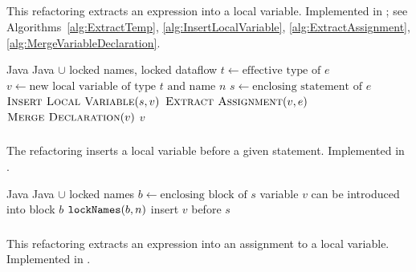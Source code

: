 \subsection{}
This refactoring extracts an expression into a local variable. Implemented in ; see Algorithms~\ref{alg:ExtractTemp}, \ref{alg:InsertLocalVariable}, \ref{alg:ExtractAssignment}, \ref{alg:MergeVariableDeclaration}.

\begin{algorithm}[p]
\caption{$\refactoring{Extract Temp}(e : \type{Expr}, n : \type{Name}) : LocalVar$}
\label{alg:ExtractTemp}
\begin{algorithmic}[1]
\REQUIRE Java
\ENSURE Java $\cup$ locked names, locked dataflow
\medskip
\STATE $t \leftarrow \text{effective type of $e$}$
\STATE $v \leftarrow \text{new local variable of type $t$ and name $n$}$
\STATE $s \leftarrow \text{enclosing statement of $e$}$
\STATE $\textsc{Insert Local Variable}(s, v)$
\STATE $\textsc{Extract Assignment}(v, e)$
\STATE $\textsc{Merge Declaration}(v)$
\RETURN $v$
\end{algorithmic}
\end{algorithm}

\subsubsection{}
The refactoring inserts a local variable before a given statement. Implemented in .

\begin{algorithm}[p]
\caption{$\refactoring{Insert Local Variable}(s : \type{Stmt}, v : \type{LocalVar}$)}
\label{alg:InsertLocalVariable}
\begin{algorithmic}[1]
\REQUIRE Java
\ENSURE Java $\cup$ locked names
\medskip
\STATE $b \leftarrow \text{enclosing block of $s$}$
\STATE \assert variable $v$ can be introduced into block $b$
\STATE $\text{\texttt{lockNames}}(b, n)$
\STATE insert $v$ before $s$
\end{algorithmic}
\end{algorithm}

\subsubsection{}
This refactoring extracts an expression into an assignment to a local variable. Implemented in .

